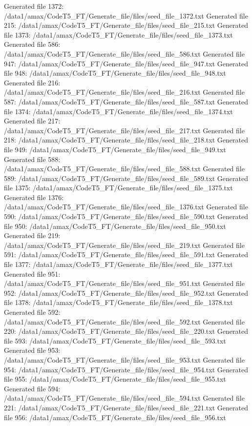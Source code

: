 Generated file 1372: /data1/amax/CodeT5_FT/Generate_file/files/seed_file_1372.txt
Generated file 215: /data1/amax/CodeT5_FT/Generate_file/files/seed_file_215.txt
Generated file 1373: /data1/amax/CodeT5_FT/Generate_file/files/seed_file_1373.txt
Generated file 586: /data1/amax/CodeT5_FT/Generate_file/files/seed_file_586.txt
Generated file 947: /data1/amax/CodeT5_FT/Generate_file/files/seed_file_947.txt
Generated file 948: /data1/amax/CodeT5_FT/Generate_file/files/seed_file_948.txt
Generated file 216: /data1/amax/CodeT5_FT/Generate_file/files/seed_file_216.txt
Generated file 587: /data1/amax/CodeT5_FT/Generate_file/files/seed_file_587.txt
Generated file 1374: /data1/amax/CodeT5_FT/Generate_file/files/seed_file_1374.txt
Generated file 217: /data1/amax/CodeT5_FT/Generate_file/files/seed_file_217.txt
Generated file 218: /data1/amax/CodeT5_FT/Generate_file/files/seed_file_218.txt
Generated file 949: /data1/amax/CodeT5_FT/Generate_file/files/seed_file_949.txt
Generated file 588: /data1/amax/CodeT5_FT/Generate_file/files/seed_file_588.txt
Generated file 589: /data1/amax/CodeT5_FT/Generate_file/files/seed_file_589.txt
Generated file 1375: /data1/amax/CodeT5_FT/Generate_file/files/seed_file_1375.txt
Generated file 1376: /data1/amax/CodeT5_FT/Generate_file/files/seed_file_1376.txt
Generated file 590: /data1/amax/CodeT5_FT/Generate_file/files/seed_file_590.txt
Generated file 950: /data1/amax/CodeT5_FT/Generate_file/files/seed_file_950.txt
Generated file 219: /data1/amax/CodeT5_FT/Generate_file/files/seed_file_219.txt
Generated file 591: /data1/amax/CodeT5_FT/Generate_file/files/seed_file_591.txt
Generated file 1377: /data1/amax/CodeT5_FT/Generate_file/files/seed_file_1377.txt
Generated file 951: /data1/amax/CodeT5_FT/Generate_file/files/seed_file_951.txt
Generated file 952: /data1/amax/CodeT5_FT/Generate_file/files/seed_file_952.txt
Generated file 1378: /data1/amax/CodeT5_FT/Generate_file/files/seed_file_1378.txt
Generated file 592: /data1/amax/CodeT5_FT/Generate_file/files/seed_file_592.txt
Generated file 220: /data1/amax/CodeT5_FT/Generate_file/files/seed_file_220.txt
Generated file 593: /data1/amax/CodeT5_FT/Generate_file/files/seed_file_593.txt
Generated file 953: /data1/amax/CodeT5_FT/Generate_file/files/seed_file_953.txt
Generated file 954: /data1/amax/CodeT5_FT/Generate_file/files/seed_file_954.txt
Generated file 955: /data1/amax/CodeT5_FT/Generate_file/files/seed_file_955.txt
Generated file 594: /data1/amax/CodeT5_FT/Generate_file/files/seed_file_594.txt
Generated file 221: /data1/amax/CodeT5_FT/Generate_file/files/seed_file_221.txt
Generated file 956: /data1/amax/CodeT5_FT/Generate_file/files/seed_file_956.txt
